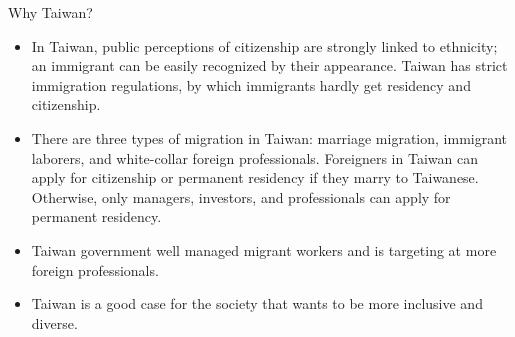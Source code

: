 \documentclass[12pt]{beamer}
\begin{document}
\begin{frame}{Why Taiwan?}
\begin{itemize} 
\item In Taiwan, public perceptions of citizenship are strongly linked to ethnicity; an immigrant can be easily recognized by their appearance.  Taiwan has strict immigration regulations, by which immigrants hardly get residency and citizenship. 
\item There are three types of migration in Taiwan: marriage migration, immigrant laborers, and white-collar foreign professionals. Foreigners in Taiwan can apply for citizenship or permanent residency if they marry to Taiwanese. Otherwise, only managers, investors, and professionals can apply for permanent residency.
\item Taiwan government well managed migrant workers and is targeting at more foreign professionals.
\item Taiwan is a good case for the society that wants to be more inclusive and diverse.
\end{itemize}
 \end{frame}

 
\end{document}
